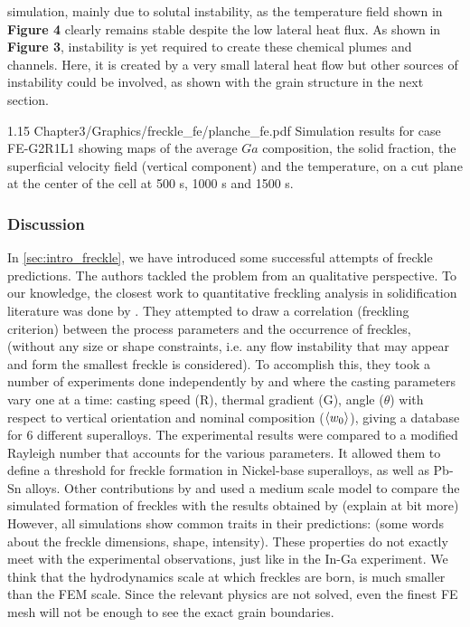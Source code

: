 simulation, mainly due to solutal instability, as the temperature field shown in \textbf{Figure 4 }clearly remains stable despite 
the low lateral heat flux. As shown in \textbf{Figure 3}, instability is yet required to create these chemical plumes and channels. 
Here, it is created by a very small lateral heat flow but other sources of instability could be involved, as shown with the grain structure in the next section.
%
\begin{landscape}
\begin{figureth}
{1.15}
{Chapter3/Graphics/freckle_fe/planche_fe.pdf}
{Simulation results for case FE-G2R1L1 showing maps of the average $Ga$ composition,
the solid fraction, the superficial velocity field (vertical component) and the temperature, 
on a cut plane at the center of the cell at 500 s, 1000 s and 1500 s.}
\label{fig:planche_fe}
\end{figureth}
\end{landscape}
%
\subsubsection{Discussion}
In \cref{sec:intro_freckle}, we have introduced some successful attempts of freckle predictions. 
The authors tackled the problem from an qualitative perspective. 
To our knowledge, the closest work to quantitative freckling analysis in solidification literature was done by \citet{ramirez_evaluation_2003}.
They attempted to draw a correlation (freckling criterion) between the process parameters and the occurrence of freckles, 
(without any size or shape constraints, i.e. any flow instability that may appear and form the smallest freckle is considered). 
To accomplish this, they took a number of experiments done independently by \citet{pollock_breakdown_1996} and \citet{auburtin_freckle_2000} 
where the casting parameters vary one at a time: casting speed (R), thermal gradient (G), angle ($\theta$) with respect to vertical 
orientation and nominal composition ($\langle w_0 \rangle$), giving a database for 6 different superalloys. The experimental results were 
compared to a modified Rayleigh number that accounts for the various parameters. It allowed them to define a threshold for freckle 
formation in Nickel-base superalloys, as well as Pb-Sn alloys.
Other contributions by \citet{yuan_new_2012} and  \citet{karagadde_3-d_2014} used a medium scale model to compare the simulated 
formation of freckles with the results obtained by \citet{shevchenko_chimney_2013} (explain at bit more)
However, all simulations show common traits in their predictions: (some words about the freckle dimensions, 
shape, intensity). These properties do not exactly meet with the experimental observations, just like in the 
In-Ga experiment. We think that the hydrodynamics scale at which freckles are born, is much smaller than the 
FEM scale. Since the relevant physics are not solved, even the finest FE mesh will not be enough to see the exact grain boundaries.
%
